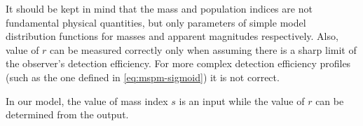             It should be kept in mind that the mass and population indices are not fundamental physical quantities,
            but only parameters of simple model distribution functions for masses and apparent magnitudes respectively.
            Also, value of $r$ can be measured correctly only when assuming there is a sharp limit of the observer's detection efficiency.
            For more complex detection efficiency profiles (such as the one defined in \cref{eq:mspm-sigmoid}) it
            is not correct.

            In our model, the value of mass index $s$ is an input while the value of $r$
            can be determined from the output.





